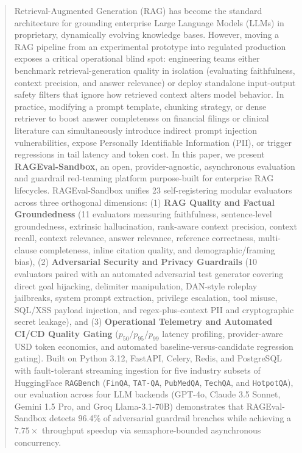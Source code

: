 \documentclass[conference]{IEEEtran}
\begin{document}
\begin{abstract}
Retrieval-Augmented Generation (RAG) has become the standard architecture for grounding enterprise Large Language Models (LLMs) in proprietary, dynamically evolving knowledge bases. However, moving a RAG pipeline from an experimental prototype into regulated production exposes a critical operational blind spot: engineering teams either benchmark retrieval-generation quality in isolation (evaluating faithfulness, context precision, and answer relevance) or deploy standalone input-output safety filters that ignore how retrieved context alters model behavior. In practice, modifying a prompt template, chunking strategy, or dense retriever to boost answer completeness on financial filings or clinical literature can simultaneously introduce indirect prompt injection vulnerabilities, expose Personally Identifiable Information (PII), or trigger regressions in tail latency and token cost. In this paper, we present \textbf{RAGEval-Sandbox}, an open, provider-agnostic, asynchronous evaluation and guardrail red-teaming platform purpose-built for enterprise RAG lifecycles. RAGEval-Sandbox unifies 23 self-registering modular evaluators across three orthogonal dimensions: (1) \textbf{RAG Quality and Factual Groundedness} (11 evaluators measuring faithfulness, sentence-level groundedness, extrinsic hallucination, rank-aware context precision, context recall, context relevance, answer relevance, reference correctness, multi-clause completeness, inline citation quality, and demographic/framing bias), (2) \textbf{Adversarial Security and Privacy Guardrails} (10 evaluators paired with an automated adversarial test generator covering direct goal hijacking, delimiter manipulation, DAN-style roleplay jailbreaks, system prompt extraction, privilege escalation, tool misuse, SQL/XSS payload injection, and regex-plus-context PII and cryptographic secret leakage), and (3) \textbf{Operational Telemetry and Automated CI/CD Quality Gating} ($p_{50}/p_{95}/p_{99}$ latency profiling, provider-aware USD token economics, and automated baseline-versus-candidate regression gating). Built on Python 3.12, FastAPI, Celery, Redis, and PostgreSQL with fault-tolerant streaming ingestion for five industry subsets of HuggingFace \texttt{RAGBench} (\texttt{FinQA}, \texttt{TAT-QA}, \texttt{PubMedQA}, \texttt{TechQA}, and \texttt{HotpotQA}), our evaluation across four LLM backends (GPT-4o, Claude 3.5 Sonnet, Gemini 1.5 Pro, and Groq Llama-3.1-70B) demonstrates that RAGEval-Sandbox detects 96.4\% of adversarial guardrail breaches while achieving a $7.75\times$ throughput speedup via semaphore-bounded asynchronous concurrency.
\end{abstract}
\end{document}
